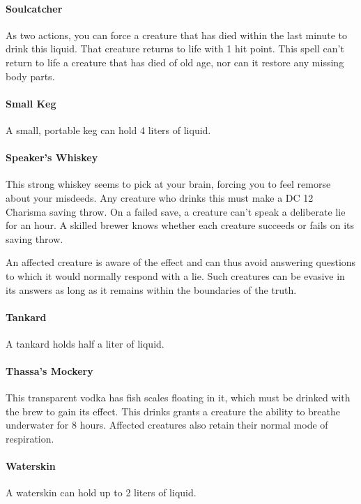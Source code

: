     \paragraph{Soulcatcher} %
        As two actions, you can force a creature that has died within the last minute to drink this liquid.
        That creature returns to life with 1 hit point.
        This spell can't return to life a creature that has died of old age, nor can it restore any missing body parts.
    \paragraph{Small Keg}
        A small, portable keg can hold 4 liters of liquid.
    \paragraph{Speaker's Whiskey} %
        This strong whiskey seems to pick at your brain, forcing you to feel remorse about your misdeeds.
        Any creature who drinks this must make a DC 12 Charisma saving throw.
        On a failed save, a creature can't speak a deliberate lie for an hour.
        A skilled brewer knows whether each creature succeeds or fails on its saving throw.

        An affected creature is aware of the effect and can thus avoid answering questions to which it would normally respond with a lie.
        Such creatures can be evasive in its answers as long as it remains within the boundaries of the truth.
    \paragraph{Tankard}
        A tankard holds half a liter of liquid.
    \paragraph{Thassa's Mockery} %
        This transparent vodka has fish scales floating in it, which must be drinked with the brew to gain its effect.
        This drinks grants a creature the ability to breathe underwater for 8 hours.
        Affected creatures also retain their normal mode of respiration.
    \paragraph{Waterskin}
        A waterskin can hold up to 2 liters of liquid.
\pagebreak

